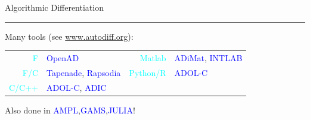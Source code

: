 \documentclass[handout,aspectratio=54]{beamer}
\numberwithin{theorem}{section}
\begin{document}
\begin{frame}{Algorithmic Differentiation}
\rule{\textwidth}{1pt}

\small\flushleft
Many tools (see \url{www.autodiff.org}):

\begin{table}[]\scriptsize
\begin{tabular}{rlrl}
\textcolor{cyan}{F}     & \textcolor{blue}{OpenAD} & \textcolor{cyan}{Matlab}   & \textcolor{blue}{ADiMat}, \textcolor{blue}{INTLAB}\\
\textcolor{cyan}{F/C}   & \textcolor{blue}{Tapenade}, \textcolor{blue}{Rapsodia} & \textcolor{cyan}{Python/R} & \textcolor{blue}{ADOL-C}        \\
\textcolor{cyan}{C/C++} & \textcolor{blue}{ADOL-C}, \textcolor{blue}{ADIC}      &&
\end{tabular}
\end{table}

\small\flushright
Also done in \textcolor{blue}{AMPL},\textcolor{blue}{GAMS},\textcolor{blue}{JULIA}!
\end{frame}
\end{document}
